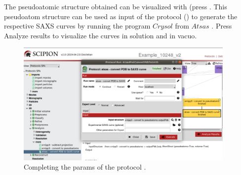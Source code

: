 The pseudoatomic structure obtained can be visualized with \chimera (press . This pseudoatom structure can be used as input of the protocol  () to generate the respective SAXS curves by running the program $Crysol$ from $Atsas$ \citep{svergun1995crysol}. Press {Analyze results} to visualize the curves in solution and in vacuo.

\begin{figure}[H]
  \centering
  \captionsetup{width=.8\linewidth} 
  \includegraphics[width=0.95\textwidth]
  {images/atsas_convert_PDB_to_SAXS.pdf}
  \caption{Completing the params of the protocol .}
  \label{fig:atsas_convert_PDB_to_SAXS}
  \end{figure}


